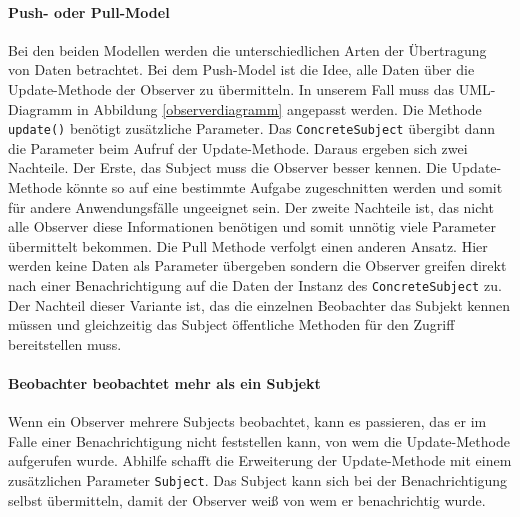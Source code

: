 \paragraph{Push- oder Pull-Model} 


Bei den beiden Modellen werden die unterschiedlichen Arten der Übertragung von Daten betrachtet. Bei dem Push-Model ist die Idee, alle Daten über die Update-Methode der Observer zu übermitteln. In unserem Fall muss das UML-Diagramm in Abbildung \ref{observerdiagramm} angepasst werden. Die Methode \texttt{update()} benötigt  zusätzliche Parameter. Das \texttt{ConcreteSubject} übergibt dann die Parameter beim Aufruf der Update-Methode.
Daraus ergeben sich zwei Nachteile. Der Erste, das Subject muss die Observer besser kennen. Die Update-Methode könnte so auf eine bestimmte Aufgabe zugeschnitten werden und somit für andere Anwendungsfälle ungeeignet sein. Der zweite Nachteile ist, das nicht alle Observer diese Informationen benötigen und somit unnötig viele Parameter übermittelt bekommen.
Die Pull Methode verfolgt einen anderen Ansatz. Hier werden keine Daten als Parameter übergeben sondern die Observer greifen direkt nach einer Benachrichtigung auf die Daten der Instanz des \texttt{ConcreteSubject} zu. Der Nachteil dieser Variante ist, das die einzelnen Beobachter das Subjekt kennen müssen und gleichzeitig das Subject öffentliche Methoden für den Zugriff bereitstellen muss.


\paragraph{Beobachter beobachtet mehr als ein Subjekt} Wenn ein Observer mehrere Subjects beobachtet, kann es passieren, das er im Falle einer Benachrichtigung nicht feststellen kann, von wem die Update-Methode aufgerufen wurde. Abhilfe schafft die Erweiterung der Update-Methode mit einem zusätzlichen Parameter \texttt{Subject}. Das Subject kann sich bei der Benachrichtigung selbst übermitteln, damit der Observer weiß von wem er benachrichtig wurde.

